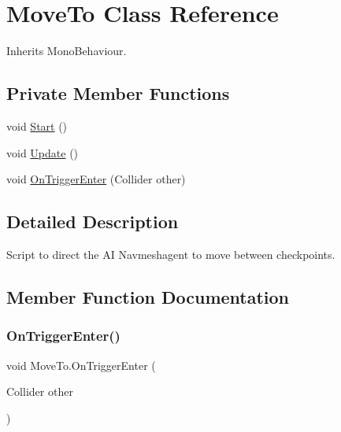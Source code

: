 \hypertarget{class_move_to}{}\section{Move\+To Class Reference}
\label{class_move_to}


Inherits Mono\+Behaviour.

\subsection*{Private Member Functions}
\begin{DoxyCompactItemize}
\item 
void \hyperlink{class_move_to_ae802f560d398f92c7cb15ffb306f4202}{Start} ()
\item 
void \hyperlink{class_move_to_a4d754b4bdb8defeaf68c99a3c6b16e9c}{Update} ()
\item 
void \hyperlink{class_move_to_a1d47b0b0f711b2d55ca15491cfcec7ee}{On\+Trigger\+Enter} (Collider other)
\end{DoxyCompactItemize}


\subsection{Detailed Description}
Script to direct the AI Navmeshagent to move between checkpoints. 



\subsection{Member Function Documentation}
\mbox{\label{class_move_to_a1d47b0b0f711b2d55ca15491cfcec7ee}} 
\subsubsection{\texorpdfstring{On\+Trigger\+Enter()}{OnTriggerEnter()}}
{\footnotesize\ttfamily void Move\+To.\+On\+Trigger\+Enter (\begin{DoxyParamCaption}\item[{Collider}]{other }\end{DoxyParamCaption})\hspace{0.3cm}{\ttfamily [private]}}



